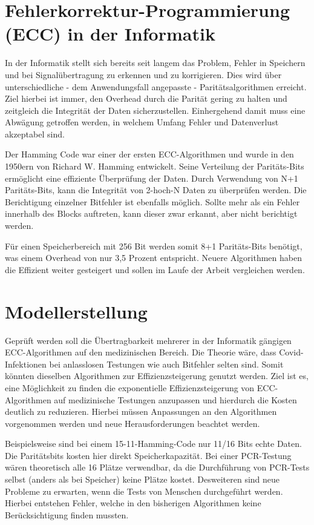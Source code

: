 \section{Fehlerkorrektur-Programmierung (ECC) in der Informatik}
In der Informatik stellt sich bereits seit langem das Problem, Fehler in Speichern und bei Signalübertragung zu erkennen und zu korrigieren.
Dies wird über unterschiedliche - dem Anwendungsfall angepasste - Paritätsalgorithmen erreicht.
Ziel hierbei ist immer, den Overhead durch die Parität gering zu halten und zeitgleich die Integrität der Daten sicherzustellen.
Einhergehend damit muss eine Abwägung getroffen werden, in welchem Umfang Fehler und Datenverlust akzeptabel sind.

Der Hamming Code war einer der ersten ECC-Algorithmen und wurde in den 1950ern von Richard W. Hamming entwickelt.
Seine Verteilung der Paritäts-Bits ermöglicht eine effiziente Überprüfung der Daten.
Durch Verwendung von N+1 Paritäts-Bits, kann die Integrität von 2-hoch-N Daten zu überprüfen  werden.
Die Berichtigung einzelner Bitfehler ist ebenfalls möglich.
Sollte mehr als ein Fehler innerhalb des Blocks auftreten, kann dieser zwar erkannt, aber nicht berichtigt werden.

Für einen Speicherbereich mit 256 Bit werden somit 8+1 Paritäts-Bits benötigt, was einem Overhead von nur 3,5 Prozent entspricht.
Neuere Algorithmen haben die Effizient weiter gesteigert und sollen im Laufe der Arbeit vergleichen werden.

\section{Modellerstellung}
Geprüft werden soll die Übertragbarkeit mehrerer in der Informatik gängigen ECC-Algorithmen auf den medizinischen Bereich.
Die Theorie wäre, dass Covid-Infektionen bei anlasslosen Testungen wie auch Bitfehler selten sind.
Somit könnten dieselben Algorithmen zur Effizienzsteigerung genutzt werden.
Ziel ist es, eine Möglichkeit zu finden die exponentielle Effizienzsteigerung von ECC-Algorithmen auf medizinische Testungen anzupassen und hierdurch die Kosten deutlich zu reduzieren.
Hierbei müssen Anpassungen an den Algorithmen vorgenommen werden und neue Herausforderungen beachtet werden.

Beispielsweise sind bei einem 15-11-Hamming-Code nur 11/16 Bits echte Daten.
Die Paritätsbits kosten hier direkt Speicherkapazität.
Bei einer PCR-Testung wären theoretisch alle 16 Plätze verwendbar, da die Durchführung von PCR-Tests selbst (anders als bei Speicher) keine Plätze kostet.
Desweiteren sind neue Probleme zu erwarten, wenn die Tests von Menschen durchgeführt werden.
Hierbei entstehen Fehler, welche in den bisherigen Algorithmen keine Berücksichtigung finden mussten.


